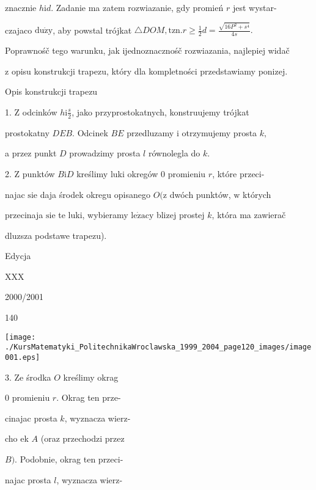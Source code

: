 \documentclass[a4paper,12pt]{article}
\begin{document}
znacznie $h\mathrm{i}d$. Zadanie ma zatem rozwiazanie, gdy promień $r$ jest wystar-

czajaco $\mathrm{d}\mathrm{u}\dot{\mathrm{z}}\mathrm{y}$, aby powstal trójkat $\triangle DOM, \mathrm{t}\mathrm{z}\mathrm{n}. r\displaystyle \geq\frac{1}{2}d=\frac{\sqrt{16P^{2}+s^{4}}}{4s}.$

Poprawnośč tego warunku, jak ijednoznacznośč rozwiazania, najlepiej widač

$\mathrm{z}$ opisu konstrukcji trapezu, który dla kompletności przedstawiamy ponizej.

Opis konstrukcji trapezu

1. $\mathrm{Z}$ odcinków $h \mathrm{i} \displaystyle \frac{s}{2}$, jako przyprostokatnych, konstruujemy trójkat

prostokatny $DEB$. Odcinek $BE$ przedluzamy $\mathrm{i}$ otrzymujemy prosta $k,$

a przez punkt $D$ prowadzimy prosta $l$ równolegla do $k.$

2. $\mathrm{Z}$ punktów $B\mathrm{i}D$ kreślimy luki okregów $0$ promieniu $r$, które przeci-

najac $\mathrm{s}\mathrm{i}\mathrm{e}$ daja środek okregu opisanego $O (\mathrm{z}$ dwóch punktów, $\mathrm{w}$ których

przecinaja $\mathrm{s}\mathrm{i}\mathrm{e}$ te luki, wybieramy $\mathrm{l}\mathrm{e}\dot{\mathrm{z}}\mathrm{a}\mathrm{c}\mathrm{y}$ blizej prostej $k$, która ma zawierač

dluzsza podstawe trapezu).





Edycja

XXX

2000/2001





140
\begin{center}
\texttt{[image: ./KursMatematyki\_PolitechnikaWroclawska\_1999\_2004\_page120\_images/image001.eps]}
\end{center}
3. Ze środka $O$ kreślimy okrag

$0$ promieniu $r$. Okrag ten prze-

cinajac prosta $k$, wyznacza wierz-

cho ek $A$ (oraz przechodzi przez

$B)$. Podobnie, okrag ten przeci-

najac prosta $l$, wyznacza wierz-
\end{document}
